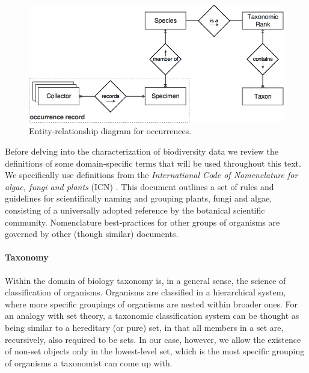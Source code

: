 




\begin{figure}[h!]
  	\centering
    \includegraphics[width=0.8\linewidth]{figures/er_occurrence.png}
    \caption{Entity-relationship diagram for occurrences.}
    \label{fig:er_occurrences}
\end{figure}


Before delving into the characterization of biodiversity data we review the definitions of some domain-specific terms that will be used throughout this text. 
We specifically use definitions from the \textit{International Code of Nomenclature for algae, fungi and plants} (ICN) \cite{McNeill2012}. This document outlines a set of rules and guidelines for scientifically naming and grouping plants, fungi and algae, consisting of a universally adopted reference by the botanical scientific community. Nomenclature best-practices for other groups of organisms are governed by other (though similar) documents.

\paragraph*{Taxonomy}
Within the domain of biology taxonomy is, in a general sense, the science of classification of organisms. 
Organisms are classified in a hierarchical system, where more specific groupings of organisms are nested within broader ones. 
For an analogy with set theory, a taxonomic classification system can be thought as being similar to a hereditary (or pure) set, in that all members in a set are, recursively, also required to be sets. In our case, however, we allow the existence of non-set objects only in the lowest-level set, which is the most specific grouping of organisms a taxonomist can come up with.

